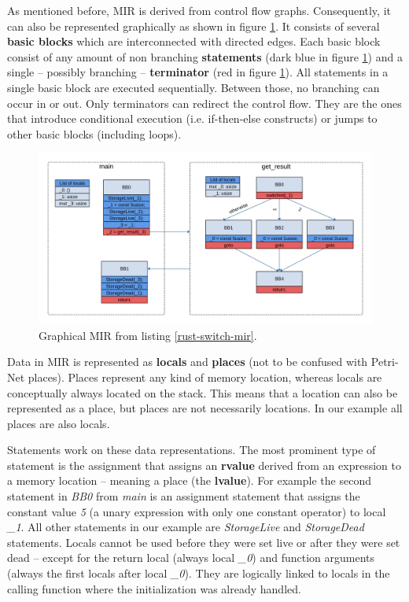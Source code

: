 As mentioned before, MIR is derived from control flow graphs\cite[chapter 2.17]{rustc-guide}.
Consequently, it can also be represented graphically as shown in figure \ref{switch-mir-graph}.
It consists of several \textbf{basic blocks} which are interconnected with directed edges.
Each basic block consist of any amount of non branching \textbf{statements} (dark blue in figure \ref{switch-mir-graph}) and a single -- possibly branching -- \textbf{terminator} (red in figure \ref{switch-mir-graph}).
All statements in a single basic block are executed sequentially.
Between those, no branching can occur in or out.
Only terminators can redirect the control flow.
They are the ones that introduce conditional execution (i.e. if-then-else constructs) or jumps to other basic blocks (including loops).

\begin{figure}
    \centering
    \includegraphics[width=\textwidth]{../diagrams/SwitchInt.png}
    \caption{
        Graphical MIR from listing \ref{rust-switch-mir}.
        }
    \label{switch-mir-graph}
\end{figure}

Data in MIR is represented as \textbf{locals} and \textbf{places} (not to be confused with Petri-Net places).
Places represent any kind of memory location, whereas locals are conceptually always located on the stack.
This means that a location can also be represented as a place, but places are not necessarily locations.
In our example all places are also locals.

Statements work on these data representations.
The most prominent type of statement is the assignment that assigns an \textbf{rvalue} derived from an expression to a memory location -- meaning a place (the \textbf{lvalue}).
For example the second statement in \textit{BB0} from \textit{main} is an assignment statement that assigns the constant value \textit{5} (a unary expression with only one constant operator) to local \textit{\_1}.
All other statements in our example are \textit{StorageLive} and \textit{StorageDead} statements.
Locals cannot be used before they were set live or after they were set dead -- except for the return local (always local \textit{\_0}) and function arguments (always the first locals after local \textit{\_0}).
They are logically linked to locals in the calling function where the initialization was already handled.

